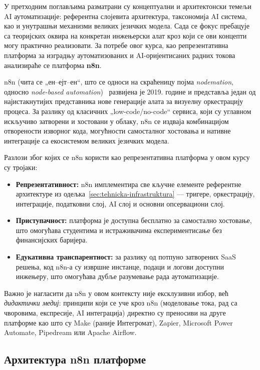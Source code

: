 У претходним поглављима разматрани су концептуални и архитектонски темељи
AI аутоматизације: референтна слојевита архитектура, таксономија AI система,
као и унутрашњи механизми великих језичких модела. Сада се фокус пребацује
са теоријских оквира на конкретан инжењерски алат кроз који се ови концепти
могу практично реализовати. За потребе овог курса, као репрезентативна
платформа за изградњу аутоматизованих и AI-оријентисаних радних токова
анализираће се платформа \textbf{n8n}.

n8n (чита се „ен–ејт–ен“, што се односи на скраћеницу појма
\textit{nodemation}, односно \textit{node-based automation})~\cite{n8n} развијена је
2019. године и представља један од најистакнутијих представника нове
генерације алата за визуелну оркестрацију процеса. За разлику од класичних
„low-code/no-code“ сервиса, који су углавном искључиво затворени и
хостовани у облаку, n8n се издваја комбинацијом отворености изворног
кода, могућности самосталног хостовања и нативне интеграције са
екосистемом великих језичких модела.

Разлози због којих се n8n користи као репрезентативна платформа у овом
курсу су тројаки:

\begin{itemize}
    \item \textbf{Репрезентативност:} n8n имплементира све кључне
    елементе референтне архитектуре из одељка~\ref{sec:tehnicka-infrastruktura} — тригере, оркестрацију,
    интеграције, податковни слој, AI слој и основни опсервациони слој.
    \item \textbf{Приступачност:} платформа је доступна бесплатно за
    самостално хостовање, што омогућава студентима и истраживачима
    експериментисање без финансијских баријера.
    \item \textbf{Едукативна транспарентност:} за разлику од потпуно
    затворених SaaS решења, код n8n-а су извршне инстанце, подаци и
    логови доступни инжењеру, што омогућава дубље разумевање рада
    аутоматизације.
\end{itemize}

Важно је нагласити да n8n у овом контексту није ексклузивни избор, већ
\textit{дидактички медиј}: принципи који се уче кроз n8n
(моделовање тока, рад са чворовима, експресије, AI интеграција)
директно су преносиви на друге платформе као што су Make (раније Интегромат),
Zapier, Microsoft Power Automate, Pipedream или Apache Airflow.

\subsection{Архитектура n8n платформе}

